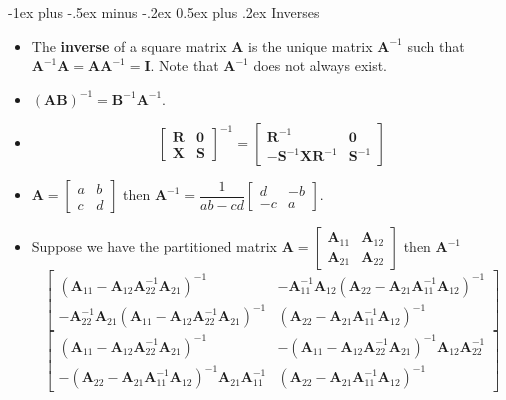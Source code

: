 \documentclass[12pt,landscape, a4paper]{article}
\makeatletter
\newcommand{\bs}[1]{\ensuremath{\boldsymbol{#1}}}
\renewcommand{\section}{\@startsection{section}{1}{0mm}%
                                {-1ex plus -.5ex minus -.2ex}%
                                {0.5ex plus .2ex}%
                                {\normalfont\large\bfseries}}
\makeatother
\begin{document}
\begin{multicols}{3}
\section{Inverses}
	\begin{itemize}
		\item The \textbf{inverse} of a square matrix \bs{A} is the unique matrix $\bs{A}^{-1}$ such that $\bs{A}^{-1}\bs{A}=\bs{A}\bs{A}^{-1}=\bs{I}.$ Note that $\bs{A}^{-1}$ does not always exist.
		\item $(\bs{A}\bs{B})^{-1} = \bs{B}^{-1}\bs{A}^{-1}$.
				\item $$\begin{bmatrix}
		\bs{R} & \bs{0} \\
		\bs{X} & \bs{S} 
		\end{bmatrix}^{-1} = \begin{bmatrix}
		\bs{R}^{-1} & \bs{0} \\
		-\bs{S}^{-1}\bs{X}\bs{R}^{-1} & \bs{S}^{-1} 
		\end{bmatrix} $$
				\item $\displaystyle \bs{A} = \begin{bmatrix}
		a & b \\
		c & d
		\end{bmatrix}$ then $\bs{A}^{-1} =  \dfrac{1}{ab - cd} \begin{bmatrix}
		d & -b \\
		-c & a
		\end{bmatrix}$.
		\item Suppose we have the partitioned matrix $\bs{A} = \begin{bmatrix}
		\bs{A}_{11} & \bs{A}_{12} \\
		\bs{A}_{21} & \bs{A}_{22}
		\end{bmatrix}$ then $\bs{A}^{-1}$
		{ \scriptsize
				$$ \begin{bmatrix}
		(\bs{A}_{11} - \bs{A}_{12}\bs{A}_{22}^{-1}\bs{A}_{21})^{-1} & -\bs{A}_{11}^{-1}\bs{A}_{12}(\bs{A}_{22} - \bs{A}_{21}\bs{A}_{11}^{-1}\bs{A}_{12})^{-1} \\
		-\bs{A}_{22}^{-1}\bs{A}_{21}(\bs{A}_{11} - \bs{A}_{12}\bs{A}_{22}^{-1}\bs{A}_{21})^{-1} & (\bs{A}_{22} - \bs{A}_{21}\bs{A}_{11}^{-1}\bs{A}_{12})^{-1}
		\end{bmatrix} $$
						$$ \begin{bmatrix}
		(\bs{A}_{11} - \bs{A}_{12}\bs{A}_{22}^{-1}\bs{A}_{21})^{-1} & -(\bs{A}_{11} - \bs{A}_{12}\bs{A}_{22}^{-1}\bs{A}_{21})^{-1}\bs{A}_{12}\bs{A}_{22}^{-1} \\
		-(\bs{A}_{22} - \bs{A}_{21}\bs{A}_{11}^{-1}\bs{A}_{12})^{-1}\bs{A}_{21}\bs{A}_{11}^{-1} & (\bs{A}_{22} - \bs{A}_{21}\bs{A}_{11}^{-1}\bs{A}_{12})^{-1}
		\end{bmatrix} $$
	}
	\end{itemize}

\end{multicols}
\end{document}
